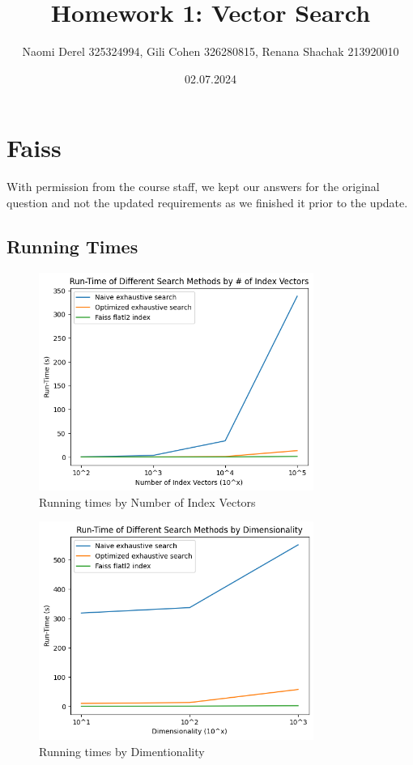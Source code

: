 \documentclass[12pt]{article}
\begin{document}
\title{Homework 1: Vector Search}
\author{Naomi Derel 325324994, Gili Cohen 326280815, Renana Shachak 213920010}
\date{02.07.2024}
\maketitle


\section{Faiss}

With permission from the course staff, we kept our answers for the original question and not the updated requirements as we finished it prior to the update.

\subsection{Running Times}

\begin{figure}[H]
    \centering
    \includegraphics[width=0.8\textwidth]{images/1_1_1.png}
    \caption{Running times by Number of Index Vectors}
\end{figure}

\begin{figure}[H]
    \centering
    \includegraphics[width=0.8\textwidth]{images/1_1_2.png}
    \caption{Running times by Dimentionality}
\end{figure}
\end{document}
